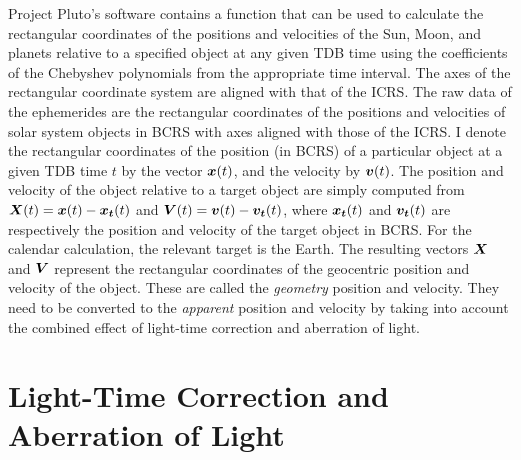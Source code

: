 \documentclass[12pt]{article}
\newcommand{\ve}[1]{\mbox{\boldmath $#1$}}
\begin{document}
\begin{CJK}{UTF8}{bkai}
Project Pluto's software contains a function that can be used to calculate 
the rectangular coordinates of the positions and velocities of the Sun, Moon, 
and planets relative to a specified object at any given TDB time using 
the coefficients of the Chebyshev polynomials from the appropriate time interval. 
The axes of the rectangular coordinate system are aligned with that of the ICRS.  
The raw data of the ephemerides are the rectangular coordinates of the positions 
and velocities of solar system objects in BCRS with axes aligned with those 
of the ICRS. I denote 
the rectangular coordinates of the position (in BCRS) of a particular object 
at a given TDB time $t$ by the vector $\ve{x}(t)$, and the 
velocity by $\ve{v}(t)$. The position and velocity of the object relative to 
a target object are simply computed from 
$\ve{X}(t)=\ve{x}(t)-\ve{x_t}(t)$ and $\ve{V}(t)=\ve{v}(t)-\ve{v_t}(t)$, 
where $\ve{x_t}(t)$ and $\ve{v_t}(t)$ are respectively the position and velocity of 
the target object in BCRS. For the calendar calculation, 
the relevant target is the Earth. The resulting vectors $\ve{X}$ and $\ve{V}$ 
represent the rectangular coordinates of the geocentric position and velocity of the 
object. These are called the {\em geometry} position and velocity. They need to be converted 
to the {\em apparent} position and velocity by taking into account the combined effect 
of light-time correction and aberration of light.

\section{Light-Time Correction and Aberration of Light}
\label{sec:lighttime}


\end{CJK}
\end{document}
